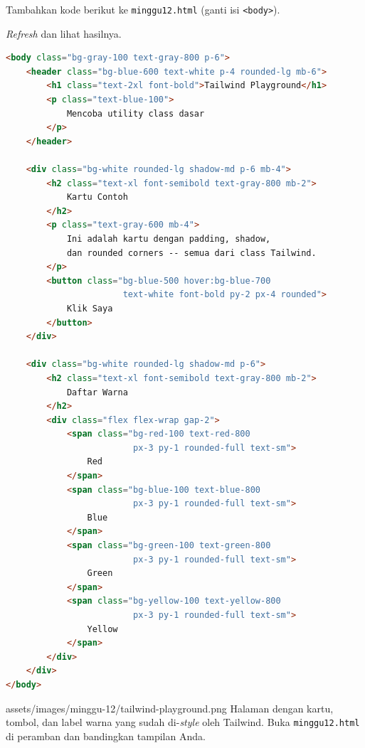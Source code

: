 \begin{langkah}
  \item Tambahkan kode berikut ke \texttt{minggu12.html} (ganti isi \texttt{<body>}).
  \item \emph{Refresh} dan lihat hasilnya.
\end{langkah}

\begin{lstlisting}[language=HTML, caption={Tailwind \emph{playground}---header, kartu, dan label warna}, label={lst:12-playground}]
<body class="bg-gray-100 text-gray-800 p-6">
    <header class="bg-blue-600 text-white p-4 rounded-lg mb-6">
        <h1 class="text-2xl font-bold">Tailwind Playground</h1>
        <p class="text-blue-100">
            Mencoba utility class dasar
        </p>
    </header>

    <div class="bg-white rounded-lg shadow-md p-6 mb-4">
        <h2 class="text-xl font-semibold text-gray-800 mb-2">
            Kartu Contoh
        </h2>
        <p class="text-gray-600 mb-4">
            Ini adalah kartu dengan padding, shadow,
            dan rounded corners -- semua dari class Tailwind.
        </p>
        <button class="bg-blue-500 hover:bg-blue-700
                       text-white font-bold py-2 px-4 rounded">
            Klik Saya
        </button>
    </div>

    <div class="bg-white rounded-lg shadow-md p-6">
        <h2 class="text-xl font-semibold text-gray-800 mb-2">
            Daftar Warna
        </h2>
        <div class="flex flex-wrap gap-2">
            <span class="bg-red-100 text-red-800
                         px-3 py-1 rounded-full text-sm">
                Red
            </span>
            <span class="bg-blue-100 text-blue-800
                         px-3 py-1 rounded-full text-sm">
                Blue
            </span>
            <span class="bg-green-100 text-green-800
                         px-3 py-1 rounded-full text-sm">
                Green
            </span>
            <span class="bg-yellow-100 text-yellow-800
                         px-3 py-1 rounded-full text-sm">
                Yellow
            </span>
        </div>
    </div>
</body>
\end{lstlisting}

\begin{tangkapanlayar}
  {assets/images/minggu-12/tailwind-playground.png}
  {Halaman dengan kartu, tombol, dan label warna yang sudah di-\emph{style} oleh Tailwind.}
  {Buka \texttt{minggu12.html} di peramban dan bandingkan tampilan Anda.}
\end{tangkapanlayar}

